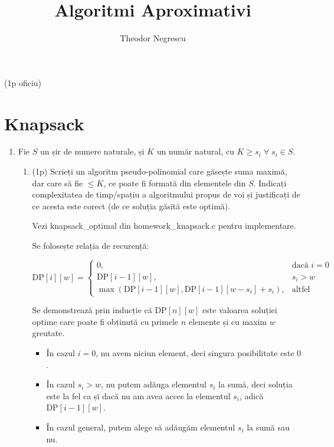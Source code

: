 \documentclass[a4paper,12pt]{article}
\title{Algoritmi Aproximativi}
\author{Theodor Negrescu}
\date{}
\newcommand*{\DP}{\text{DP}}
\begin{document}
\maketitle

(1p oficiu)

\section{Knapsack}

\begin{enumerate}

\item
Fie $S$ un șir de numere naturale, și $K$ un număr natural, cu $K \geq s_i \;\forall\; s_i \in S$.

\begin{enumerate}

\item (1p)
Scrieți un algoritm pseudo-polinomial care găsește suma maximă,
dar care să fie $\leq K$, ce poate fi formată din elementele din $S$.
Indicați complexitatea de timp/spațiu a algoritmului propus de voi și justificați de ce
acesta este corect (de ce soluția găsită este optimă).

Vezi knapsack\_optimal din homework\_knapsack.c pentru implementare.

Se folosește relația de recurență:

\[
\DP[i][w] =
\begin{cases}
0, & \text{dacă } i = 0 \\
\DP[i - 1][w], & s_i > w \\
\max(\DP[i - 1][w], \DP[i - 1][w - s_i] + s_i), & \text{altfel}
\end{cases}
\]

Se demonstrează prin inducție că $\DP[n][w]$ este valoarea soluției optime
care poate fi obținută cu primele $n$ elemente și cu maxim $w$ greutate.

\begin{itemize}

\item
În cazul $i = 0$, nu avem niciun element, deci singura posibilitate este $0$.

\item
În cazul $s_i > w$, nu putem adăuga elementul $s_i$ la sumă, deci soluția este
la fel ca și dacă nu am avea acces la elementul $s_i$, adică $\DP[i - 1][w]$.

\item
În cazul general, putem alege să adăugăm elementul $s_i$ la sumă sau nu.


\end{itemize}
\end{enumerate}
\end{enumerate}
\end{document}
